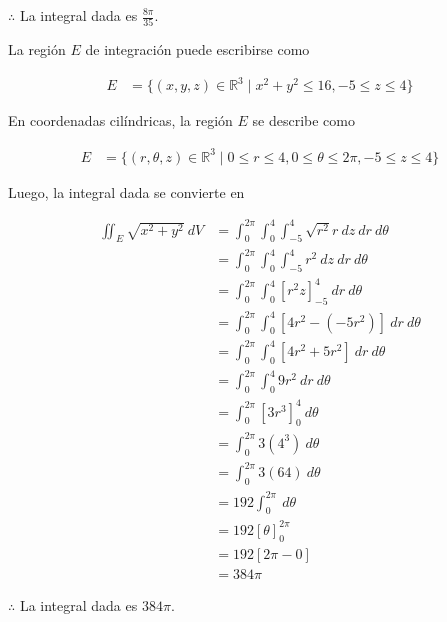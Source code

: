 \documentclass[12pt]{exam}
\begin{document}
\begin{questions}
  $\therefore$ La integral dada es $\frac{8\pi}{35}$.


  La región $E$ de integración puede escribirse como

  \begin{align*}
  E
  &= \{ (x,y,z) \in \mathbb{R}^3 \mid x^2+y^2 \leq 16, -5 \leq z \leq 4 \}
  \end{align*}

  En coordenadas cilíndricas, la región $E$ se describe como

  \begin{align*}
  E
  &= \{ (r, \theta, z) \in \mathbb{R}^3 \mid 0 \leq r \leq 4, 0 \leq \theta \leq 2\pi, -5 \leq z \leq 4 \}
  \end{align*}

  Luego, la integral dada se convierte en

  \begin{align*}
  \iint_E \sqrt{x^2+y^2}~dV
  &= \int_0^{2\pi} \int_0^4 \int_{-5}^4 \sqrt{r^2} r ~ dz ~ dr ~ d\theta \\
  &= \int_0^{2\pi} \int_0^4 \int_{-5}^4 r^2 ~ dz ~ dr ~ d\theta \\
  &= \int_0^{2\pi} \int_0^4 \left[ r^2z \right]_{-5}^4 ~ dr ~ d\theta \\
  &= \int_0^{2\pi} \int_0^4 \left[ 4r^2 - (-5r^2) \right] ~ dr ~ d\theta \\
  &= \int_0^{2\pi} \int_0^4 \left[ 4r^2 + 5r^2 \right] ~ dr ~ d\theta \\
  &= \int_0^{2\pi} \int_0^4 9r^2 ~ dr ~ d\theta \\
  &= \int_0^{2\pi} \left[ 3r^3 \right]_0^4 ~ d\theta \\
  &= \int_0^{2\pi} 3(4^3) ~ d\theta \\
  &= \int_0^{2\pi} 3(64) ~ d\theta \\
  &= 192 \int_0^{2\pi} ~ d\theta \\
  &= 192 \left[ \theta \right]_0^{2\pi} \\
  &= 192 \left[ 2\pi - 0 \right] \\
  &= 384\pi
  \end{align*}

  $\therefore$ La integral dada es $384\pi$.
  
\end{questions}

\vskip30pt
\RaggedRight

\newpage



\pagestyle{foot}    %
\end{document}
